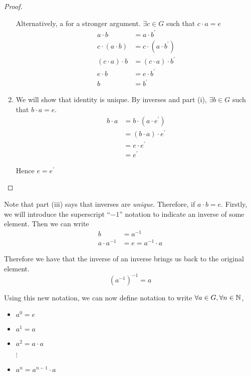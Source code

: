 \documentclass{article}
\begin{document}
\begin{proof}
\begin{enumerate}
        Alternatively, a for a stronger argument. $\exists c \in G$ such that $c \cdot a = e$
        \begin{align*}
            a \cdot b &= a \cdot b^{\prime} \\
            c \cdot (a \cdot b) &= c \cdot (a \cdot b^{\prime}) \\
            (c \cdot a) \cdot b &= (c \cdot a) \cdot b^{\prime} \tag{associativity} \\
            e \cdot b &= e \cdot b^{\prime} \\
            b &= b^{\prime} \tag{ii}
        \end{align*}

        \item We will show that identity is unique. By inverses and part (i), $\exists b \in G$ such that $b \cdot a = e$.
        \begin{align*}
            b \cdot a &= b \cdot (a \cdot e^{\prime}) \tag{hypothesis}\\
            &= (b \cdot a) \cdot e^{\prime} \tag{hypothesis}\\
            &= e \cdot e^{\prime} \\
            &= e^{\prime}
        \end{align*}
        
        Hence $e = e^{\prime}$
    \end{enumerate}
\end{proof}


Note that part (iii) says that inverses are \emph{unique}. Therefore, if $a \cdot b = e$. Firstly, we will introduce the superscript ``$-1$'' notation to indicate an inverse of some element. Then we can write
\begin{align*}
    b &= a^{-1} \\
    a \cdot a^{-1} &= e = a^{-1} \cdot a
\end{align*}

Therefore we have that the inverse of an inverse brings us back to the original element.
\[
    (a^{-1})^{-1} = a  
\]

Using this new notation, we can now define notation to write $\forall a \in G, \forall n \in \mathbb{N}$,
\begin{center}
    \begin{itemize}
        \item $a^0 = e$
        \item $a^1 = a$
        \item $a^2 = a \cdot a$
        \item[$\vdots$]
        \item $a^n = a^{n-1} \cdot a$
    \end{itemize}
\end{center}
\end{document}
